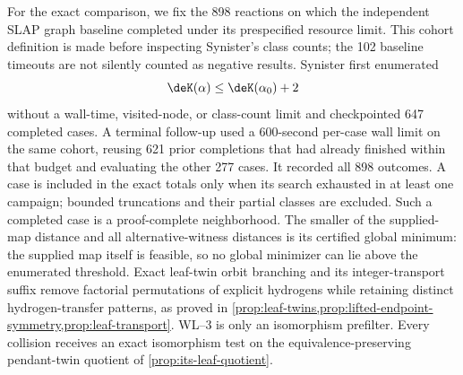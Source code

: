 For the exact comparison, we fix the 898 reactions on which the independent
SLAP graph baseline completed under its prespecified resource limit.  This
cohort definition is made before inspecting Synister's class counts; the 102
baseline timeouts are not silently counted as negative results.  Synister
first enumerated
\[
  \deK(\alpha)\le \deK(\alpha_0)+2
\]
without a wall-time, visited-node, or class-count limit and checkpointed 647
completed cases.  A terminal follow-up used a 600-second per-case wall limit
on the same cohort, reusing 621 prior completions that had already finished
within that budget and evaluating the other 277 cases.  It recorded all 898
outcomes.  A case is included in the exact totals only when its search
exhausted in at least one campaign; bounded truncations and their partial
classes are excluded.  Such a completed case is a proof-complete
neighborhood.  The smaller of the supplied-map distance and all
alternative-witness distances is its certified global minimum: the supplied
map itself is feasible, so no global minimizer can lie above the enumerated
threshold.  Exact leaf-twin
orbit branching and its integer-transport suffix remove factorial
permutations of explicit hydrogens while retaining distinct hydrogen-transfer
patterns, as proved in
\cref{prop:leaf-twins,prop:lifted-endpoint-symmetry,prop:leaf-transport}.
WL--3 is only an isomorphism
prefilter.  Every collision receives an exact isomorphism test on the
equivalence-preserving pendant-twin quotient of
\cref{prop:its-leaf-quotient}.


